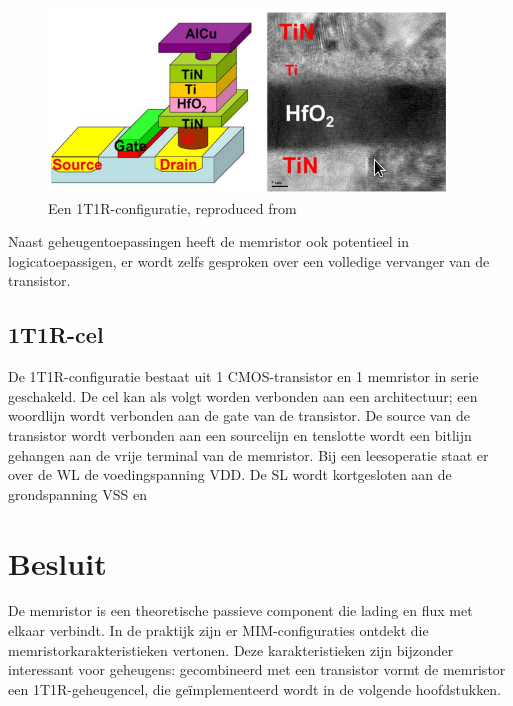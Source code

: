 \begin{figure}
  \centering
  \includegraphics[scale=0.6]{../fig/hfdstk-cel-1T1R.png}
  \caption[Een 1T1R-configuratie]{Een 1T1R-configuratie, reproduced from\cite{Won12}}
  \label{fig:1T1R}
\end{figure}

Naast geheugentoepassingen heeft de memristor ook potentieel in logicatoepassigen, er wordt zelfs gesproken over een volledige vervanger van de transistor\cite{Kue05}.

\subsection{1T1R-cel}
\label{1T1R}
De 1T1R-configuratie bestaat uit 1 CMOS-transistor en 1 memristor in serie geschakeld. De cel kan als volgt worden verbonden aan een architectuur; een woordlijn wordt verbonden aan de gate van de transistor. De source van de transistor wordt verbonden aan een sourcelijn en tenslotte wordt een bitlijn gehangen aan de vrije terminal van de memristor. Bij een leesoperatie staat er over de WL de voedingspanning VDD. De SL wordt kortgesloten aan de grondspanning VSS en 
\section{Besluit}
De memristor is een theoretische passieve component die lading en flux met elkaar verbindt. In de praktijk zijn er MIM-configuraties ontdekt die memristorkarakteristieken vertonen. Deze karakteristieken zijn bijzonder interessant voor geheugens: gecombineerd met een transistor vormt de memristor een 1T1R-geheugencel, die geïmplementeerd wordt in de volgende hoofdstukken.
